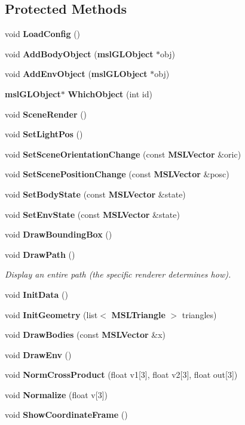 \subsection*{Protected Methods}
\begin{CompactItemize}
\item 
void {\bf Load\-Config} ()
\item 
void {\bf Add\-Body\-Object} ({\bf msl\-GLObject} $\ast$obj)
\item 
void {\bf Add\-Env\-Object} ({\bf msl\-GLObject} $\ast$obj)
\item 
{\bf msl\-GLObject}$\ast$ {\bf Which\-Object} (int id)
\item 
void {\bf Scene\-Render} ()
\item 
void {\bf Set\-Light\-Pos} ()
\item 
void {\bf Set\-Scene\-Orientation\-Change} (const {\bf MSLVector} \&oric)
\item 
void {\bf Set\-Scene\-Position\-Change} (const {\bf MSLVector} \&posc)
\item 
void {\bf Set\-Body\-State} (const {\bf MSLVector} \&state)
\item 
void {\bf Set\-Env\-State} (const {\bf MSLVector} \&state)
\item 
void {\bf Draw\-Bounding\-Box} ()
\item 
void {\bf Draw\-Path} ()
\begin{CompactList}\small\item\em Display an entire path (the specific renderer determines how).\item\end{CompactList}\item 
void {\bf Init\-Data} ()
\item 
void {\bf Init\-Geometry} (list$<$ {\bf MSLTriangle} $>$ triangles)
\item 
void {\bf Draw\-Bodies} (const {\bf MSLVector} \&x)
\item 
void {\bf Draw\-Env} ()
\item 
void {\bf Norm\-Cross\-Product} (float v1[3], float v2[3], float out[3])
\item 
void {\bf Normalize} (float v[3])
\item 
void {\bf Show\-Coordinate\-Frame} ()
\end{CompactItemize}
